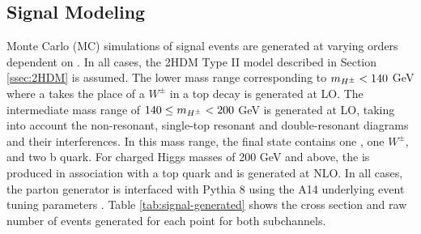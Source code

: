 		\subsection{Signal Modeling}\label{ssec:sig-modeling}
		Monte Carlo (MC) simulations of \Hpm signal events are generated at varying orders dependent on \mHpm. In all cases, the 2HDM Type II model described in Section \ref{ssec:2HDM} is assumed. The lower mass range corresponding to $m_{H^{\pm}} < 140$ GeV where a \Hpm takes the place of a $W^{\pm}$ in a top decay is generated at LO. The intermediate mass range of $140 \leq m_{H^{\pm}} < 200 $ GeV is generated at LO, taking into account the non-resonant, single-top resonant and double-resonant diagrams and their interferences. In this mass range, the final state contains one \Hpm, one $W^{\pm}$, and two b quark. For charged Higgs masses of 200 GeV and above, the \Hpm is produced in association with a top quark and is generated at NLO. In all cases, the parton generator is interfaced with Pythia 8 using the A14 underlying event tuning parameters \cite{Pythia8-tunes}. Table \ref{tab:signal-generated} shows the cross section and raw number of events generated for each \mHpm point for both subchannels.

